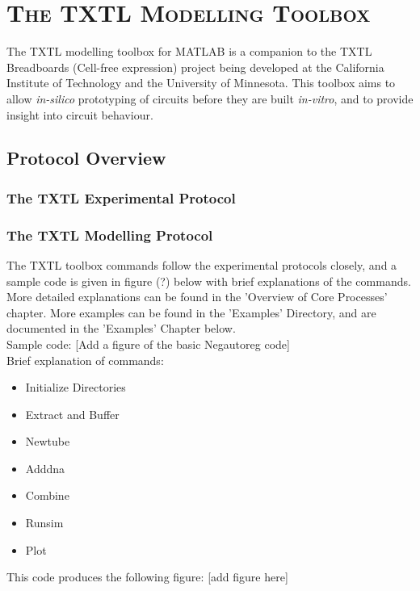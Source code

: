 
\chapter{\textsc{The TXTL Modelling Toolbox}}

The TXTL modelling toolbox for MATLAB is a companion to the TXTL Breadboards (Cell-free expression) project being developed at the California Institute of Technology and the University of Minnesota. This toolbox aims to allow \textit{in-silico} prototyping of circuits before they are built \textit{in-vitro}, and to provide insight into circuit behaviour. 

	\section{Protocol Overview}

		\subsection{The TXTL Experimental Protocol}
		\subsection{The TXTL Modelling Protocol}
		The TXTL toolbox commands follow the experimental protocols closely, and a sample code is given in figure (?) below with brief explanations of the commands. More detailed explanations can be found in the 'Overview of Core Processes' chapter. More examples can be found in the 'Examples' Directory, and are documented in the 'Examples' Chapter below. \\

\noindent Sample code:
[Add a figure of the basic Negautoreg code] \\

\noindent Brief explanation of commands:
\begin{itemize}
	\item Initialize Directories
	\item Extract and Buffer
	\item Newtube
	\item Adddna
	\item Combine
	\item Runsim
	\item Plot
\end{itemize}

\noindent This code produces the following figure: [add figure here]
